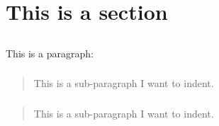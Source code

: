 \documentclass{article}
\begin{document}
\section{This is a section}

\subsection{} This is a paragraph:

\begin{quote}
\subsubsection{} This is a sub-paragraph I want to indent.
\end{quote}
\begin{quote}
\subsubsection{} This is a sub-paragraph I want to indent.
\end{quote}
\end{document}
